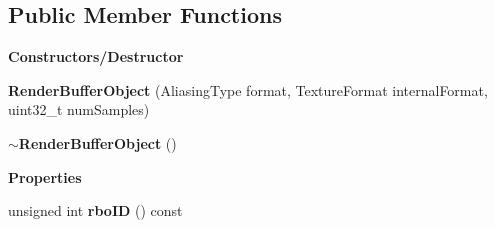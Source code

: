 \subsection*{Public Member Functions}
\begin{Indent}\textbf{ Constructors/\+Destructor}\par
\begin{DoxyCompactItemize}
\item 
\mbox{\label{classrev_1_1_render_buffer_object_aae8486de1167ba4b1c0a57307f5f4aca}} 
{\bfseries Render\+Buffer\+Object} (Aliasing\+Type format, Texture\+Format internal\+Format, uint32\+\_\+t num\+Samples)
\item 
\mbox{\label{classrev_1_1_render_buffer_object_a711420db9ba1e553871b040dfd39e04d}} 
{\bfseries $\sim$\+Render\+Buffer\+Object} ()
\end{DoxyCompactItemize}
\end{Indent}
\begin{Indent}\textbf{ Properties}\par
\begin{DoxyCompactItemize}
\item 
\mbox{\label{classrev_1_1_render_buffer_object_adf365872964c33673353d573d20e0469}} 
unsigned int {\bfseries rbo\+ID} () const
\end{DoxyCompactItemize}
\end{Indent}
